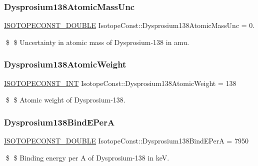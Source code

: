 \subsubsection{\texorpdfstring{Dysprosium138\+Atomic\+Mass\+Unc}{Dysprosium138AtomicMassUnc}}
{\footnotesize\ttfamily \mbox{\hyperlink{group___isotope_const-_macros_ga8f45a7272ce02c0b4c65c44636ed719a}{I\+S\+O\+T\+O\+P\+E\+C\+O\+N\+S\+T\+\_\+\+D\+O\+U\+B\+LE}} Isotope\+Const\+::\+Dysprosium138\+Atomic\+Mass\+Unc = 0.}

\$ \$ Uncertainty in atomic mass of Dysprosium-\/138 in amu. \mbox{\label{group___isotope_const-_dysprosium-_dy138_gadc7f8b2c910709ed480d85914d89ad24}} 
\subsubsection{\texorpdfstring{Dysprosium138\+Atomic\+Weight}{Dysprosium138AtomicWeight}}
{\footnotesize\ttfamily \mbox{\hyperlink{group___isotope_const-_macros_ga5f18360b3e99483a35c32d789e62621c}{I\+S\+O\+T\+O\+P\+E\+C\+O\+N\+S\+T\+\_\+\+I\+NT}} Isotope\+Const\+::\+Dysprosium138\+Atomic\+Weight = 138}

\$ \$ Atomic weight of Dysprosium-\/138. \mbox{\label{group___isotope_const-_dysprosium-_dy138_ga0737bb3daf2423e79a3f41259e7e2c5c}} 
\subsubsection{\texorpdfstring{Dysprosium138\+Bind\+E\+PerA}{Dysprosium138BindEPerA}}
{\footnotesize\ttfamily \mbox{\hyperlink{group___isotope_const-_macros_ga8f45a7272ce02c0b4c65c44636ed719a}{I\+S\+O\+T\+O\+P\+E\+C\+O\+N\+S\+T\+\_\+\+D\+O\+U\+B\+LE}} Isotope\+Const\+::\+Dysprosium138\+Bind\+E\+PerA = 7950}

\$ \$ Binding energy per A of Dysprosium-\/138 in keV. \mbox{\label{group___isotope_const-_dysprosium-_dy138_gac3a6a04f9ad0f35957d8b82b4d216b4e}} 
